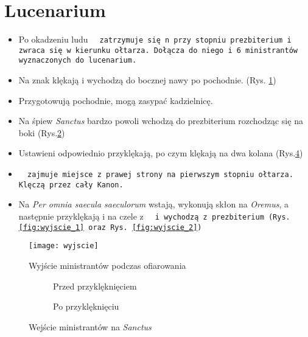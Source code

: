 	\section{Lucenarium}
	
		
		\begin{itemize}
			\item Po okadzeniu ludu \tt~ zatrzymuje się n przy stopniu prezbiterium i zwraca się w kierunku ołtarza. Dołącza do niego  i 6 ministrantów wyznaczonych do lucenarium. 
			\item Na znak  klękają i wychodzą do bocznej nawy po pochodnie.	(Rys. \ref{fig:wyjscie})	
			\item Przygotowują pochodnie, mogą zasypać kadzielnicę. 
			\item Na śpiew \textit{Sanctus} bardzo powoli wchodzą do prezbiterium rozchodząc się na boki (Rys.\ref{fig:wejscie_1})
			\item Ustawieni odpowiednio przyklękają, po czym klękają na dwa kolana (Rys.\ref{fig:wejscie_2})			
			\item \tt~ zajmuje miejsce z prawej strony na pierwszym stopniu ołtarza. Klęczą przez cały Kanon. 
			\item Na \textit{Per omnia saecula saeculorum} wstają, wykonują skłon na \textit{Oremus}, a następnie przyklękają i na czele z \tt~ i  wychodzą z prezbiterium (Rys. \ref{fig:wyjscie_1} oraz Rys. \ref{fig:wyjscie_2})
		\end{itemize}
	
		\begin{figure}[h]
			\centering
			\texttt{[image: wyjscie]}
			\caption{Wyjście ministrantów podczas ofiarowania}
			\label{fig:wyjscie}
		\end{figure}
		
		\begin{figure}[ht]
			\begin{subfigure}[t]{.5\linewidth}
				\centering\usebox{\imagebox}
				\caption{Przed przyklęknięciem}
				\label{fig:wejscie_1}
			\end{subfigure}\qquad
			\begin{subfigure}[t]{.5\linewidth}
				\centering{}%
				\caption{Po przyklęknięciu}
				\label{fig:wejscie_2}
			\end{subfigure}
			\caption{Wejście ministrantów na \textit{Sanctus}}
		\end{figure}
		
